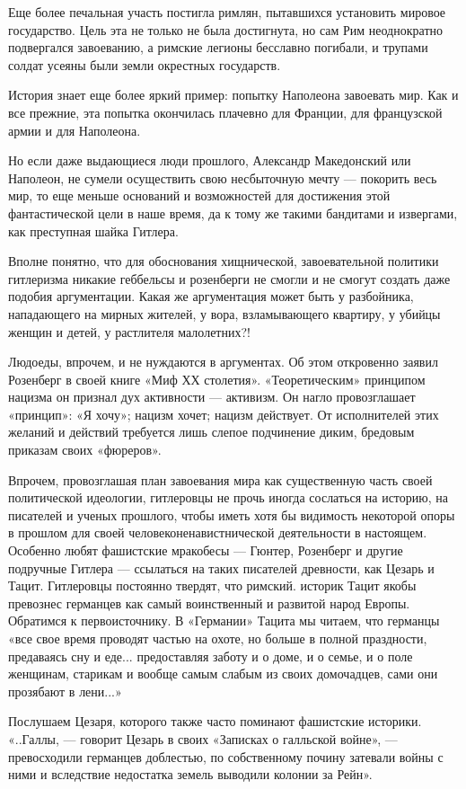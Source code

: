 \documentclass[12pt, a4paper, openany]{book}
\begin{document}
Еще более печальная участь постигла римлян, пытавшихся установить мировое государство. Цель эта не только не была достигнута, но сам Рим неоднократно подвергался завоеванию, а римские легионы бесславно погибали, и трупами солдат усеяны были земли окрестных государств.

История знает еще более яркий пример: попытку Наполеона завоевать мир. Как и все прежние, эта попытка окончилась плачевно для Франции, для французской армии и для Наполеона.

Но если даже выдающиеся люди прошлого, Александр Македонский или Наполеон, не сумели осуществить свою несбыточную мечту — покорить весь мир, то еще меньше оснований и возможностей для достижения этой фантастической цели в наше время, да к тому же такими бандитами и извергами, как преступная шайка Гитлера.

Вполне понятно, что для обоснования хищнической, завоевательной политики гитлеризма никакие геббельсы и розенберги не смогли и не смогут создать даже подобия аргументации. Какая же аргументация может быть у разбойника, нападающего на мирных жителей, у вора, взламывающего квартиру, у убийцы женщин и детей, у растлителя малолетних?!

Людоеды, впрочем, и не нуждаются в аргументах. Об этом откровенно заявил Розенберг в своей книге «Миф ХХ столетия». «Теоретическим» принципом нацизма он признал дух активности — активизм. Он нагло провозглашает «принцип»: «Я хочу»; нацизм хочет; нацизм действует. От исполнителей этих желаний и действий требуется лишь слепое подчинение диким, бредовым приказам своих «фюреров».

Впрочем, провозглашая план завоевания мира как существенную часть своей политической идеологии, гитлеровцы не прочь иногда сослаться на историю, на писателей и ученых прошлого, чтобы иметь хотя бы видимость некоторой опоры в прошлом для своей человеконенавистнической деятельности в настоящем. Особенно любят фашистские мракобесы — Гюнтер, Розенберг и другие подручные Гитлера — ссылаться на таких писателей древности, как Цезарь и Тацит. Гитлеровцы постоянно твердят, что римский. историк Тацит якобы превознес германцев как самый воинственный и развитой народ Европы. Обратимся к первоисточнику. В «Германии» Тацита мы читаем, что германцы «все свое время проводят частью на охоте, но больше в полной праздности, предаваясь сну и еде... предоставляя заботу и о доме, и о семье, и о поле женщинам, старикам и вообще самым слабым из своих домочадцев, сами они прозябают в лени...»

Послушаем Цезаря, которого также часто поминают фашистские историки. «..Галлы, — говорит Цезарь в своих «Записках о галльской войне», — превосходили германцев доблестью, по собственному почину затевали войны с ними и вследствие недостатка земель выводили колонии за Рейн».
\end{document}
